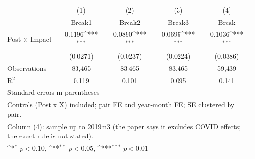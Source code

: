 {
\def\sym#1{\ifmmode^{#1}\else\(^{#1}\)\fi}
\begin{tabular}{l*{4}{c}}
\toprule
            &\multicolumn{1}{c}{(1)}&\multicolumn{1}{c}{(2)}&\multicolumn{1}{c}{(3)}&\multicolumn{1}{c}{(4)}\\
            &\multicolumn{1}{c}{Break1}&\multicolumn{1}{c}{Break2}&\multicolumn{1}{c}{Break3}&\multicolumn{1}{c}{Break}\\
\midrule
Post \(\times\) Impact&      0.1196\sym{***}&      0.0890\sym{***}&      0.0696\sym{***}&      0.1036\sym{***}\\
            &    (0.0271)         &    (0.0237)         &    (0.0224)         &    (0.0386)         \\
\midrule
Observations&      83,465         &      83,465         &      83,465         &      59,439         \\
R\(^2\)     &       0.119         &       0.101         &       0.095         &       0.141         \\
\bottomrule
\multicolumn{5}{l}{\footnotesize Standard errors in parentheses}\\
\multicolumn{5}{l}{\footnotesize Controls (Post x X) included; pair FE and year-month FE; SE clustered by pair.}\\
\multicolumn{5}{l}{\footnotesize Column (4): sample up to 2019m3 (the paper says it excludes COVID effects; the exact rule is not stated).}\\
\multicolumn{5}{l}{\footnotesize \sym{*} \(p<0.10\), \sym{**} \(p<0.05\), \sym{***} \(p<0.01\)}\\
\end{tabular}
}
